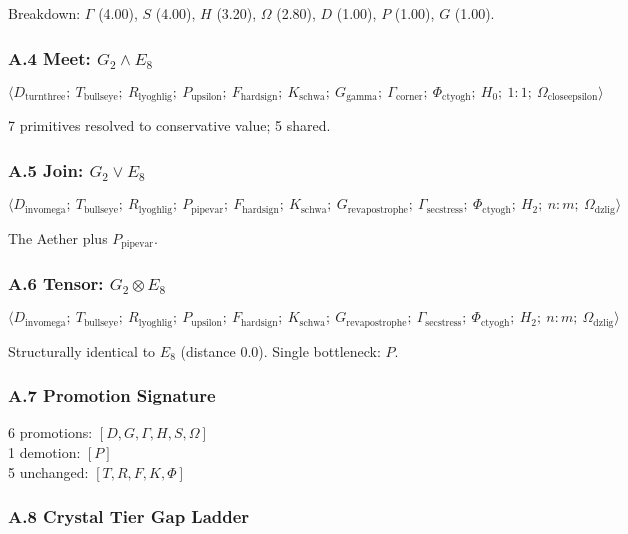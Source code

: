 \documentclass[12pt,a4paper]{article}
\begin{document}
Breakdown: $\Gamma$ (4.00), $S$ (4.00), $H$ (3.20), $\Omega$ (2.80), $D$ (1.00), $P$ (1.00), $G$ (1.00).

\subsubsection{A.4 Meet: $G_2 \wedge E_8$}

\[\langle D_{\text{turnthree}};\ T_{\text{bullseye}};\ R_{\text{lyoghlig}};\ P_{\text{upsilon}};\ F_{\text{hardsign}};\ K_{\text{schwa}};\ G_{\text{gamma}};\ \Gamma_{\text{corner}};\ \Phi_{\text{ctyogh}};\ H_0;\ 1{:}1;\ \Omega_{\text{closeepsilon}} \rangle\]

7 primitives resolved to conservative value; 5 shared.

\subsubsection{A.5 Join: $G_2 \vee E_8$}

\[\langle D_{\text{invomega}};\ T_{\text{bullseye}};\ R_{\text{lyoghlig}};\ P_{\text{pipevar}};\ F_{\text{hardsign}};\ K_{\text{schwa}};\ G_{\text{revapostrophe}};\ \Gamma_{\text{secstress}};\ \Phi_{\text{ctyogh}};\ H_2;\ n{:}m;\ \Omega_{\text{dzlig}} \rangle\]

The Aether plus $P_{\text{pipevar}}$.

\subsubsection{A.6 Tensor: $G_2 \otimes E_8$}

\[\langle D_{\text{invomega}};\ T_{\text{bullseye}};\ R_{\text{lyoghlig}};\ P_{\text{upsilon}};\ F_{\text{hardsign}};\ K_{\text{schwa}};\ G_{\text{revapostrophe}};\ \Gamma_{\text{secstress}};\ \Phi_{\text{ctyogh}};\ H_2;\ n{:}m;\ \Omega_{\text{dzlig}} \rangle\]

Structurally identical to $E_8$ (distance 0.0). Single bottleneck: $P$.

\subsubsection{A.7 Promotion Signature}

6 promotions: $[D, G, \Gamma, H, S, \Omega]$ \\
1 demotion: $[P]$ \\
5 unchanged: $[T, R, F, K, \Phi]$

\subsubsection{A.8 Crystal Tier Gap Ladder}
\end{document}

